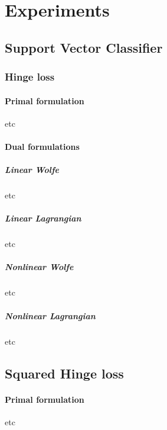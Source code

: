 \section{Experiments}


\subsection{Support Vector Classifier}


\subsubsection{Hinge loss}

\paragraph{Primal formulation}

etc



\paragraph{Dual formulations}

\subparagraph{Linear Wolfe}

etc



\subparagraph{Linear Lagrangian}

etc



\subparagraph{Nonlinear Wolfe}

etc



\subparagraph{Nonlinear Lagrangian}

etc




\subsection{Squared Hinge loss}

\paragraph{Primal formulation}

etc





